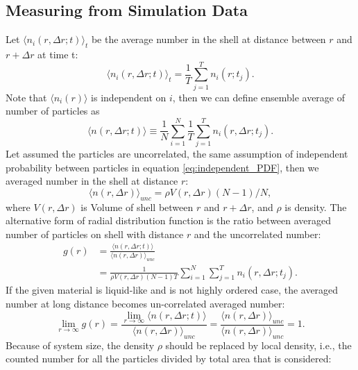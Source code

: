 \documentclass[10pt, a4paper]{article}
\begin{document}
\begin{appendices}
  \subsection{Measuring from Simulation Data}
  Let $\langle n_i(r, \Delta r; t)\rangle_t$ be the average number in the shell at distance between $r$ and $r+\Delta r$ at time t: 
  \begin{equation}
    \langle n_i(r, \Delta r; t)\rangle_t = \frac{1}{T}\sum_{j=1}^{T}n_{i}(r;t_j).
  \end{equation}
  Note that $\langle n_i(r)\rangle$ is independent on $i$, then we can define ensemble average of number of particles as
  \begin{equation}
    \langle n(r, \Delta r; t)\rangle \equiv \frac{1}{N}\sum_{i=1}^{N}\frac{1}{T}\sum_{j=1}^{T}n_{i}(r, \Delta r; t_j).
  \end{equation}
  Let assumed the particles are uncorrelated, the same assumption of independent probability between particles in equation \eqref{eq:independent_PDF}, then we averaged number in the shell at distance $r$:
  \begin{equation}
    \langle n(r, \Delta r)\rangle_{unc} = \rho V(r, \Delta r) (N-1)/N,
  \end{equation}
  where $V(r, \Delta r)$ is Volume of shell between $r$ and $r+\Delta r$, and $\rho$ is density.
  The alternative form of radial distribution function is the ratio between averaged number of particles on shell with distance $r$ and the uncorrelated number:
  \begin{align}
    g(r) &= \frac{\langle n(r, \Delta r; t)\rangle}{\langle n(r, \Delta r)\rangle_{unc}} \\
    &= \frac{1}{\rho V(r, \Delta r)(N-1)T}\sum_{i=1}^{N}\sum_{j=1}^{T}n_i(r, \Delta r; t_j).\label{eq:practical_RDF}
  \end{align}
  If the given material is liquid-like and is not highly ordered case, the averaged number at long distance becomes un-correlated averaged number:
  \begin{equation}
    \lim_{r\to\infty} g(r) = \frac{\lim_{r\to\infty}\langle n(r,\Delta r;t)\rangle}{\langle n(r,\Delta r)\rangle_{unc}} = \frac{\langle n(r,\Delta r)\rangle_{unc}}{\langle n(r,\Delta r)\rangle_{unc}} = 1.
  \end{equation}
  Because of system size, the density $\rho$ should be replaced by local density, i.e., the counted number for all the particles divided by total area that is considered:
  \begin{equation}

\end{equation}
\end{appendices}
\end{document}
